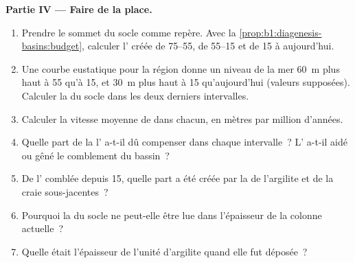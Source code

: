 \begin{problem}
\noindent\textbf{Partie IV --- Faire de la place.}
\begin{enumerate}[resume]
  \item Prendre le sommet du socle comme repère. Avec la
        \cref{prop:b1:diagenesis-basins:budget}, calculer l'
        créée de \qtyrange{75}{55}{\Ma}, de \qtyrange{55}{15}{\Ma} et
        de \qty{15}{\Ma} à aujourd'hui.
  \item Une courbe eustatique pour la région donne un niveau de la mer \qty{60}{m} plus haut à
        \qty{55}{\Ma} qu'à \qty{15}{\Ma}, et \qty{30}{m} plus haut à
        \qty{15}{\Ma} qu'aujourd'hui (valeurs supposées). Calculer la  du
        socle dans les deux derniers intervalles.
  \item Calculer la vitesse moyenne de  dans chacun, en mètres par million
        d'années.
  \item Quelle part de la  l' a-t-il dû compenser dans chaque
        intervalle~? L' a-t-il aidé ou gêné le comblement du bassin~?
  \item De l' comblée depuis \qty{15}{\Ma}, quelle part a été créée par la
         de l'argilite et de la craie sous-jacentes~?
  \item Pourquoi la  du socle ne peut-elle être lue dans l'épaisseur
        de la colonne actuelle~?
  \item Quelle était l'épaisseur de l'unité d'argilite quand elle fut déposée~?
\end{enumerate}
\end{problem}
